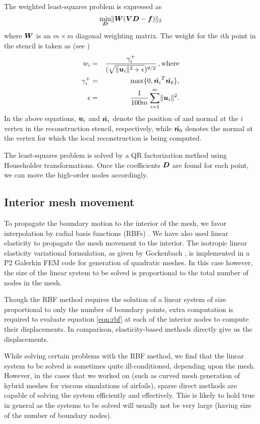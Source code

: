 The weighted least-squares problem is expressed as
\begin{equation}
\min_{\boldsymbol{D}} \lVert \boldsymbol{W}(\boldsymbol{V}\boldsymbol{D}-\boldsymbol{f})\rVert_2
\label{eq:sr_wls}
\end{equation}
where $\boldsymbol{W}$ is an $m \times m$ diagonal weighting matrix. The weight for the $i$th point in the stencil is taken as (see \cite{sr:diffquant})
\begin{eqnarray}
w_i &=& \frac{\gamma_i^+}{(\sqrt{\lVert\boldsymbol{u}_i\rVert^2 + \epsilon})^{d/2}} \, , \text{where} \\
\gamma_i^+ &=& \max\{0,\hat{\boldsymbol{n}_i}^ T\hat{\boldsymbol{n}_0}\}, \\
\epsilon &=& \frac{1}{100m} \sum_{i=1}^m \lVert\boldsymbol{u}_i \rVert^2.
\label{eq:sr_weight}
\end{eqnarray}
In the above equations, $\boldsymbol{u}_i$ and $\hat{\boldsymbol{n}_i}$ denote the position of and normal at the $i$ vertex in the reconstruction stencil, respectively, while $\hat{\boldsymbol{n}_0}$ denotes the normal at the vertex for which the local reconstruction is being computed.

The least-squares problem is solved by a QR factorization method using Householder transformations. Once the coefficients $\boldsymbol{D}$ are found for each point, we can move the high-order nodes accordingly.

\subsection{Interior mesh movement}

To propagate the boundary motion to the interior of the mesh, we favor interpolation by radial basis functions (RBFs) \cite{mm:rbf}. We have also used linear elasticity to propagate the mesh movement to the interior. The isotropic linear elasticity variational formulation, as given by Gockenbach \cite{gockenbach}, is implemented in a P2 Galerkin FEM code for generation of quadratic meshes. In this case however, the size of the linear system to be solved is proportional to the total number of nodes in the mesh.

Though the RBF method requires the solution of a linear system of size proportional to only the number of boundary points, extra computation is required to evaluate equation \eqref{eqn:rbf} at each of the interior nodes to compute their displacements. In comparison, elasticity-based methods directly give us the displacements. 

While solving certain problems with the RBF method, we find that the linear system to be solved is sometimes quite ill-conditioned, depending upon the mesh. However, in the cases that we worked on (such as curved mesh generation of hybrid meshes for viscous simulations of airfoils), sparse direct methods are capable of solving the system efficiently and effectively. This is likely to hold true in general as the systems to be solved will usually not be very large (having size of the number of boundary nodes).

